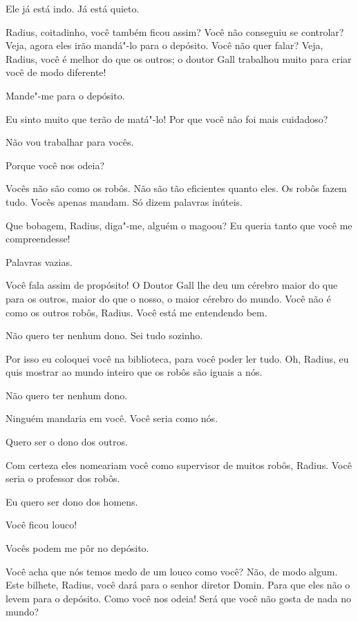   Ele já está indo. Já está quieto.

 Radius, coitadinho, você também ficou assim? Você não conseguiu se
controlar? Veja, agora eles irão mandá"-lo para o depósito. Você não quer falar?
Veja, Radius, você é melhor do que os outros; o doutor Gall trabalhou muito para
criar você de modo diferente!

 Mande"-me para o depósito.

 Eu sinto muito que terão de matá"-lo! Por que você não foi mais cuidadoso?

 Não vou trabalhar para vocês.

 Porque você nos odeia?

 Vocês não são como os robôs. Não são tão eficientes quanto eles. Os
robôs fazem tudo. Vocês apenas mandam. Só dizem palavras inúteis.

 Que bobagem, Radius, diga"-me, alguém o magoou? Eu queria tanto que você
me compreendesse!

 Palavras vazias.

 Você fala assim de propósito! O Doutor Gall lhe deu um cérebro maior do
que para os outros, maior do que o nosso, o maior cérebro do mundo. Você não é
como os outros robôs, Radius. Você está me entendendo bem.

 Não quero ter nenhum dono. Sei tudo sozinho.

 Por isso eu coloquei você na biblioteca, para você poder ler tudo. Oh,
Radius, eu quis mostrar ao mundo inteiro que os robôs são iguais a nós.

 Não quero ter nenhum dono.

 Ninguém mandaria em você. Você seria como nós.

 Quero ser o dono dos outros.

 Com certeza eles nomeariam você como supervisor de muitos robôs, Radius.
Você seria o professor dos robôs.

 Eu quero ser dono dos homens.

 Você ficou louco!

 Vocês podem me pôr no depósito.

 Você acha que nós temos medo de um louco como você?  Não, de modo algum. Este bilhete, Radius, você dará para
o senhor diretor Domin. Para que eles não o levem para o depósito.
 Como você nos odeia! Será que você não gosta de nada no
mundo?


